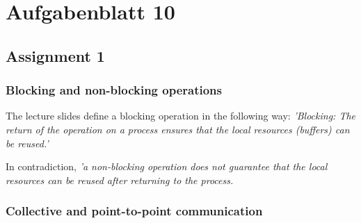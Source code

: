 \section{Aufgabenblatt 10}

\subsection{Assignment 1}
	\subsubsection{Blocking and non-blocking operations}
		The lecture slides define a blocking operation in the following way: 
		\textit{'Blocking: The return of the operation on a process ensures that the local resources (buffers) can be reused.'} 
		
		In contradiction, \textit{'a non-blocking operation does not guarantee that the local resources can be reused after returning to the process.}
		
		
	
	\subsubsection{Collective and point-to-point communication}
		
